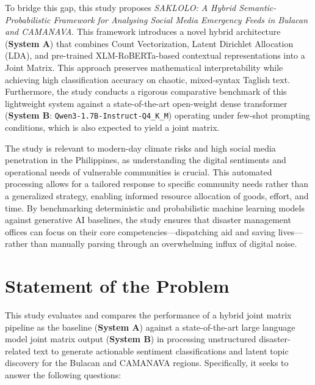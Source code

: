 \documentclass[12pt,a4paper]{report}
\newcommand{\sysA}{\textbf{System A}}
\newcommand{\sysB}{\textbf{System B}}
\newcommand{\qwen}{\texttt{Qwen3-1.7B-Instruct-Q4\_K\_M}}
\newcommand{\xlmr}{XLM-RoBERTa}
\begin{document}
To bridge this gap, this study proposes \emph{SAKLOLO: A Hybrid
Semantic-Probabilistic Framework for Analysing Social Media Emergency Feeds in
Bulacan and CAMANAVA}. This framework introduces a novel hybrid architecture
(\sysA) that combines Count Vectorization, Latent Dirichlet Allocation (LDA),
and pre-trained \xlmr-based contextual representations into a Joint Matrix.
This approach preserves mathematical interpretability while achieving high
classification accuracy on chaotic, mixed-syntax Taglish text. Furthermore,
the study conducts a rigorous comparative benchmark of this lightweight system
against a state-of-the-art open-weight dense transformer (\sysB: \qwen)
operating under few-shot prompting conditions, which is also expected to yield
a joint matrix.

The study is relevant to modern-day climate risks and high social media
penetration in the Philippines, as understanding the digital sentiments and
operational needs of vulnerable communities is crucial. This automated
processing allows for a tailored response to specific community needs rather
than a generalized strategy, enabling informed resource allocation of goods,
effort, and time. By benchmarking deterministic and probabilistic machine
learning models against generative AI baselines, the study ensures that
disaster management offices can focus on their core competencies---dispatching
aid and saving lives---rather than manually parsing through an overwhelming
influx of digital noise.

\section{Statement of the Problem}

This study evaluates and compares the performance of a hybrid joint matrix
pipeline as the baseline (\sysA) against a state-of-the-art large language
model joint matrix output (\sysB) in processing unstructured disaster-related
text to generate actionable sentiment classifications and latent topic
discovery for the Bulacan and CAMANAVA regions. Specifically, it seeks to
answer the following questions:
\end{document}
